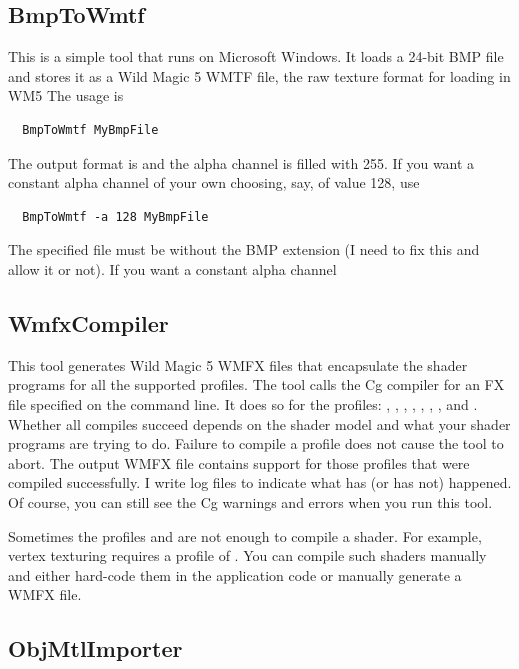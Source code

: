 \documentclass{article}
\begin{document}
\subsection{BmpToWmtf}

This is a simple tool that runs on Microsoft Windows.  It loads a
24-bit BMP file and stores it as a Wild Magic 5 WMTF file, the
raw texture format for loading in WM5  The usage is
\begin{verbatim}
  BmpToWmtf MyBmpFile
\end{verbatim}
The output format is  and the alpha channel
is filled with 255.  If you want a constant alpha channel of your
own choosing, say, of value 128, use
\begin{verbatim}
  BmpToWmtf -a 128 MyBmpFile
\end{verbatim}
The specified file must be without the BMP extension (I need to fix this
and allow it or not).  If you want a constant alpha channel

\subsection{WmfxCompiler}

This tool generates Wild Magic 5 WMFX files that encapsulate the shader
programs for all the supported profiles.  The tool calls the Cg compiler
for an FX file specified on the command line.  It does so for the
profiles:  , , ,
, , , ,
and .  Whether all compiles succeed depends on the shader
model and what your shader programs are trying to do.  Failure to compile
a profile does not cause the tool to abort.  The output WMFX file contains
support for those profiles that were compiled successfully.  I write
log files to indicate what has (or has not) happened.  Of course, you
can still see the Cg warnings and errors when you run this tool.

Sometimes the profiles  and  are not enough
to compile a shader.  For example, vertex texturing requires a profile
of .  You can compile such shaders manually and either
hard-code them in the application code or manually generate a WMFX file.

\subsection{ObjMtlImporter}
\end{document}
